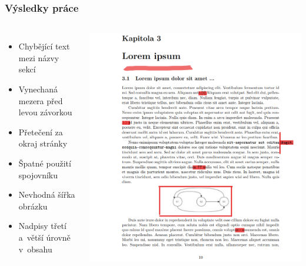 \begin{frame}
  \frametitle{Výsledky práce}
  \begin{columns}
      \begin{itemize}
        \pause
        \item Chybějící text mezi názvy sekcí
        \pause
        \item Vynechaná mezera před levou závorkou
        \pause
        \item Přetečení za okraj stránky
        \pause
        \item Špatné použití spojovníku
        \pause
        \item Nevhodná šířka obrázku
        \pause
        \item Nadpisy třetí a~větší úrovně v~obsahu
      \end{itemize}
      
      \centering
      \includegraphics[width=\textwidth]{img/future-annotated.png}
  \end{columns}
\end{frame}




